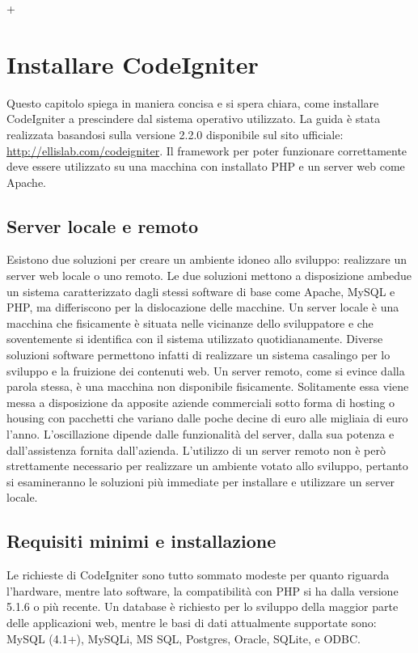 +%
\chapter{Installare CodeIgniter}
\label{cap:installazione}

Questo capitolo spiega in maniera concisa e si spera chiara, come installare CodeIgniter a prescindere dal sistema operativo utilizzato. La guida è stata realizzata basandosi sulla versione 2.2.0 disponibile sul sito ufficiale: \url{http://ellislab.com/codeigniter}. Il framework per poter funzionare correttamente deve essere utilizzato su una macchina con installato \ac{PHP} e un server web come Apache.

\section{Server locale e remoto}
Esistono due soluzioni per creare un ambiente idoneo allo sviluppo: realizzare un server web locale o uno remoto. Le due soluzioni mettono a disposizione ambedue un sistema caratterizzato dagli stessi software di base come Apache, \ac{MySQL} e \ac{PHP}, ma differiscono per la dislocazione delle macchine. Un server locale è una macchina che fisicamente è situata nelle vicinanze dello sviluppatore e che soventemente si identifica con il sistema utilizzato quotidianamente. Diverse soluzioni software permettono infatti di realizzare un sistema casalingo per lo sviluppo e la fruizione dei contenuti web. Un server remoto, come si evince dalla parola stessa, è una macchina non disponibile fisicamente. Solitamente essa viene messa a disposizione da apposite aziende commerciali sotto forma di hosting o housing con pacchetti che variano dalle poche decine di euro alle migliaia di euro l'anno. L'oscillazione dipende dalle funzionalità del server, dalla sua potenza e dall'assistenza fornita dall'azienda. L'utilizzo di un server remoto non è però strettamente necessario per realizzare un ambiente votato allo sviluppo, pertanto si esamineranno le soluzioni più immediate per installare e utilizzare un server locale.

\section*{Requisiti minimi e installazione}
Le richieste di CodeIgniter sono tutto sommato modeste per quanto riguarda l'hardware, mentre lato software, la compatibilità con \ac{PHP} si ha dalla versione 5.1.6 o più recente. Un database è richiesto per lo sviluppo della maggior parte delle applicazioni web, mentre le basi di dati attualmente supportate sono: MySQL (4.1+), MySQLi, MS SQL, Postgres, Oracle, SQLite, e ODBC.

